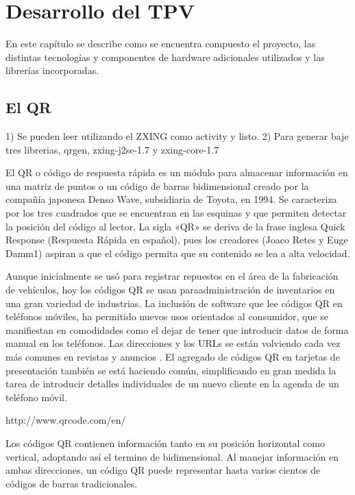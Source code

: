 \chapter{Desarrollo del \acf{TPV}}
\label{cpt:tpv}

En este cap\'itulo se describe como se encuentra compuesto el proyecto, las distintas tecnolog\'ias y componentes de hardware adicionales utilizados y las librer\'ias incorporadas.

\section{El \ac{QR}}
\label{sec:tpv.qr}

1) Se pueden leer utilizando el ZXING como activity y listo.
2) Para generar baje tres librerias, qrgen, zxing-j2se-1.7 y zxing-core-1.7

El \ac{QR} o c\'odigo de respuesta rápida es un m\'odulo para almacenar informaci\'on en una matriz de puntos o un c\'odigo de barras bidimensional creado por la compañía japonesa Denso Wave, subsidiaria de Toyota, en 1994. Se caracteriza por los tres cuadrados que se encuentran en las esquinas y que permiten detectar la posici\'on del c\'odigo al lector. La sigla «QR» se deriva de la frase inglesa Quick Response (Respuesta R\'apida en español), pues los creadores (Joaco Retes y Euge Damm1) aspiran a que el c\'odigo permita que su contenido se lea a alta velocidad.


Aunque inicialmente se us\'o para registrar repuestos en el área de la fabricaci\'on de vehículos, hoy los c\'odigos QR se usan paraadministraci\'on de inventarios en una gran variedad de industrias. La inclusi\'on de software que lee c\'odigos QR en teléfonos m\'oviles, ha permitido nuevos usos orientados al consumidor, que se manifiestan en comodidades como el dejar de tener que introducir datos de forma manual en los teléfonos. Las direcciones y los URLs se están volviendo cada vez más comunes en revistas y anuncios . El agregado de c\'odigos QR en tarjetas de presentaci\'on también se está haciendo común, simplificando en gran medida la tarea de introducir detalles individuales de un nuevo cliente en la agenda de un teléfono m\'ovil.

http://www.qrcode.com/en/

Los c\'odigos QR contienen informaci\'on tanto en su posici\'on horizontal como vertical, adoptando así el termino de bidimensional. Al manejar informaci\'on en ambas direcciones, un c\'odigo QR puede representar hasta varios cientos de c\'odigos de barras tradicionales.

